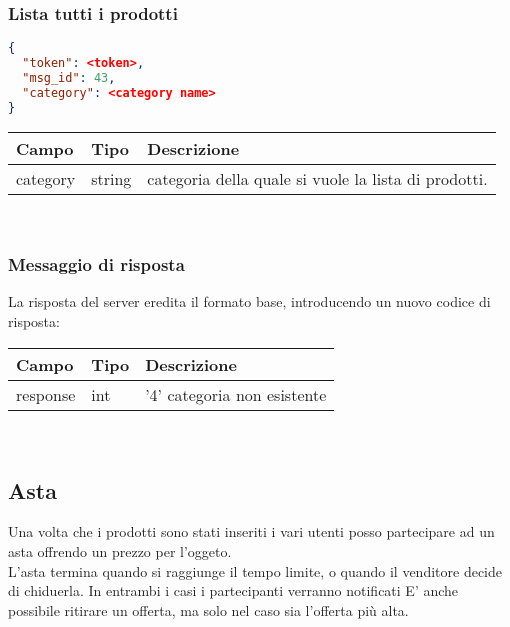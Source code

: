 \subsubsection{Lista tutti i prodotti} \label{sssec:lp}
\begin{lstlisting}[language=json]
{
  "token": <token>,
  "msg_id": 43,
  "category": <category name>
}
\end{lstlisting}

\begin{tabular}{|l | l | l |}
\hline
Campo & Tipo & Descrizione \\ \hline
category & string & categoria  della quale si vuole la lista di prodotti. \\ \hline
\end{tabular} \\
\subsubsection{Messaggio di risposta}
La risposta del server eredita il formato base, introducendo un nuovo codice di risposta:\\
\begin{tabular}{|l | l | l |}
\hline
Campo & Tipo & Descrizione \\ \hline
response & int & '4' categoria non esistente \\ \hline
\end{tabular} \\


\subsection{Asta}
Una volta che i prodotti sono stati inseriti i vari utenti posso partecipare ad un asta offrendo un prezzo per l'oggeto.\\
L'asta termina quando si raggiunge il tempo limite, o quando il venditore decide di chiduerla. In entrambi i casi i partecipanti verranno notificati
E' anche possibile ritirare un offerta, ma solo nel caso sia l'offerta più alta.
